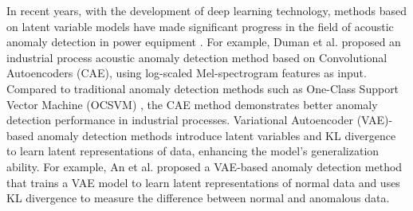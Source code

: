 \documentclass{article}
\begin{document}
In recent years, with the development of deep learning technology, methods based on latent variable models have made significant progress in the field of acoustic anomaly detection in power equipment \cite{AE-AD, AE-AD-2, CAE-AD, VAE-AD, VAE-AD-2, SAE-AD}. For example, Duman et al. \cite{CAE-AD} proposed an industrial process acoustic anomaly detection method based on Convolutional Autoencoders (CAE), using log-scaled Mel-spectrogram features as input. Compared to traditional anomaly detection methods such as One-Class Support Vector Machine (OCSVM) \cite{ocsvm}, the CAE method demonstrates better anomaly detection performance in industrial processes. Variational Autoencoder (VAE)-based anomaly detection methods \cite{VAE-AD, VAE-AD-2} introduce latent variables and KL divergence to learn latent representations of data, enhancing the model's generalization ability. For example, An et al. \cite{VAE-AD} proposed a VAE-based anomaly detection method that trains a VAE model to learn latent representations of normal data and uses KL divergence to measure the difference between normal and anomalous data.

\end{document}
